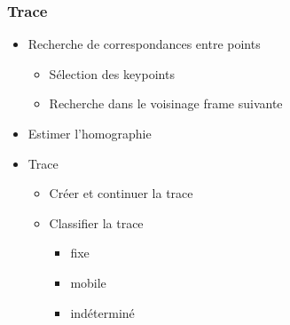 \begin{frame}
  \frametitle{Trace}
  \begin{itemize}
  \item Recherche de correspondances entre points
  	\begin{itemize}
  	\item Sélection des keypoints
  	\item Recherche dans le voisinage frame suivante
  	\end{itemize}
  \item Estimer l'homographie
  \item Trace
  	\begin{itemize}
  	\item Créer et continuer la trace
  	\item Classifier la trace
  	\begin{itemize}
  		\item fixe
  		\item mobile
  		\item indéterminé
  	\end{itemize}
  	\end{itemize}
  \end{itemize}
  


\end{frame}


